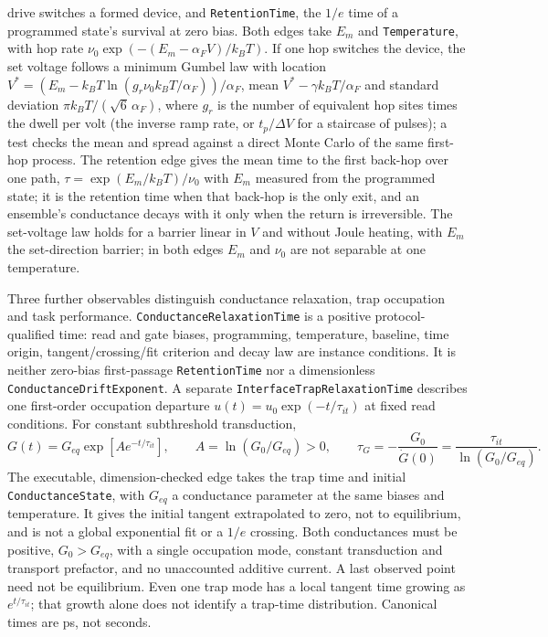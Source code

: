 \documentclass[11pt,a4paper]{article}
\begin{document}
drive switches a formed device, and \texttt{RetentionTime}, the $1/e$ time of a
programmed state's survival at zero bias. Both edges take $E_m$ and
\texttt{Temperature}, with hop rate $\nu_0 \exp(-(E_m - \alpha_F V)/k_B T)$. If
one hop switches the device, the set voltage follows a minimum Gumbel law with
location $V^* = (E_m - k_B T \ln(g_r \nu_0 k_B T/\alpha_F))/\alpha_F$, mean
$V^* - \gamma k_B T/\alpha_F$ and standard deviation
$\pi k_B T/(\sqrt{6}\,\alpha_F)$, where $g_r$ is the number of equivalent hop sites
times the dwell per volt (the inverse ramp rate, or $t_p/\Delta V$ for a staircase
of pulses); a test checks the mean and spread against a direct Monte Carlo of the
same first-hop process. The retention edge gives the mean time to the first
back-hop over one path, $\tau = \exp(E_m/k_B T)/\nu_0$ with $E_m$ measured from the
programmed state; it is the retention time when that back-hop is the only exit,
and an ensemble's conductance decays with it only when the return is irreversible.
The set-voltage law holds for a barrier linear in $V$ and without Joule heating,
with $E_m$ the set-direction barrier; in both edges $E_m$ and $\nu_0$ are not
separable at one temperature.

Three further observables distinguish conductance relaxation, trap occupation
and task performance. \texttt{ConductanceRelaxationTime} is a positive
protocol-qualified time: read and gate biases, programming, temperature,
baseline, time origin, tangent/crossing/fit criterion and decay law are instance
conditions. It is neither zero-bias first-passage \texttt{RetentionTime} nor a
dimensionless \texttt{ConductanceDriftExponent}. A separate
\texttt{InterfaceTrapRelaxationTime} describes one first-order occupation
departure $u(t)=u_0\exp(-t/\tau_{it})$ at fixed read conditions. For constant
subthreshold transduction,
\[
G(t)=G_{eq}\exp\!\left[Ae^{-t/\tau_{it}}\right],\qquad
A=\ln(G_0/G_{eq})>0,\qquad
\tau_G=-\frac{G_0}{\dot G(0)}=\frac{\tau_{it}}{\ln(G_0/G_{eq})}.
\]
The executable, dimension-checked edge takes the trap time and initial
\texttt{ConductanceState}, with $G_{eq}$ a conductance parameter at the same
biases and temperature. It gives the initial tangent extrapolated to zero, not
to equilibrium, and is not a global exponential fit or a $1/e$ crossing.
Both conductances must be positive, $G_0>G_{eq}$, with a single occupation mode,
constant transduction and transport prefactor, and no unaccounted additive
current. A last observed point need not be equilibrium. Even one trap mode has
a local tangent time growing as $e^{t/\tau_{it}}$; that growth alone does not
identify a trap-time distribution. Canonical times are ps, not seconds.
\end{document}
